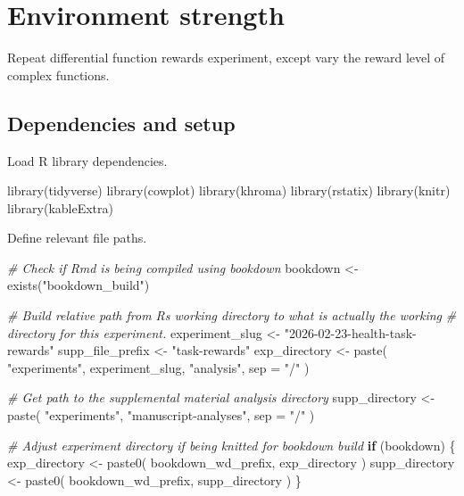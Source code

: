 \documentclass[
]{book}
\newenvironment{Shaded}{\begin{snugshade}}{\end{snugshade}}
\newcommand{\AttributeTok}[1]{\textcolor[rgb]{0.77,0.63,0.00}{#1}}
\newcommand{\CommentTok}[1]{\textcolor[rgb]{0.56,0.35,0.01}{\textit{#1}}}
\newcommand{\ControlFlowTok}[1]{\textcolor[rgb]{0.13,0.29,0.53}{\textbf{#1}}}
\newcommand{\FunctionTok}[1]{\textcolor[rgb]{0.00,0.00,0.00}{#1}}
\newcommand{\NormalTok}[1]{#1}
\newcommand{\OtherTok}[1]{\textcolor[rgb]{0.56,0.35,0.01}{#1}}
\newcommand{\StringTok}[1]{\textcolor[rgb]{0.31,0.60,0.02}{#1}}
\begin{document}
\hypertarget{environment-strength}{%
\chapter{Environment strength}\label{environment-strength}}

Repeat differential function rewards experiment,
except vary the reward level of complex functions.

\hypertarget{dependencies-and-setup-2}{%
\section{Dependencies and setup}\label{dependencies-and-setup-2}}

Load R library dependencies.

\begin{Shaded}
\begin{Highlighting}[]
\FunctionTok{library}\NormalTok{(tidyverse)}
\FunctionTok{library}\NormalTok{(cowplot)}
\FunctionTok{library}\NormalTok{(khroma)}
\FunctionTok{library}\NormalTok{(rstatix)}
\FunctionTok{library}\NormalTok{(knitr)}
\FunctionTok{library}\NormalTok{(kableExtra)}
\end{Highlighting}
\end{Shaded}

Define relevant file paths.

\begin{Shaded}
\begin{Highlighting}[]
\CommentTok{\# Check if Rmd is being compiled using bookdown}
\NormalTok{bookdown }\OtherTok{\textless{}{-}} \FunctionTok{exists}\NormalTok{(}\StringTok{"bookdown\_build"}\NormalTok{)}

\CommentTok{\# Build relative path from R\textquotesingle{}s working directory to what is actually the working}
\CommentTok{\# directory for this experiment.}
\NormalTok{experiment\_slug }\OtherTok{\textless{}{-}} \StringTok{"2026{-}02{-}23{-}health{-}task{-}rewards"}
\NormalTok{supp\_file\_prefix }\OtherTok{\textless{}{-}} \StringTok{"task{-}rewards"}
\NormalTok{exp\_directory }\OtherTok{\textless{}{-}} \FunctionTok{paste}\NormalTok{(}
  \StringTok{"experiments"}\NormalTok{,}
\NormalTok{  experiment\_slug,}
  \StringTok{"analysis"}\NormalTok{,}
  \AttributeTok{sep =} \StringTok{"/"}
\NormalTok{)}

\CommentTok{\# Get path to the supplemental material analysis directory}
\NormalTok{supp\_directory }\OtherTok{\textless{}{-}} \FunctionTok{paste}\NormalTok{(}
  \StringTok{"experiments"}\NormalTok{,}
  \StringTok{"manuscript{-}analyses"}\NormalTok{,}
  \AttributeTok{sep =} \StringTok{"/"}
\NormalTok{)}

\CommentTok{\# Adjust experiment directory if being knitted for bookdown build}
\ControlFlowTok{if}\NormalTok{ (bookdown) \{}
\NormalTok{  exp\_directory }\OtherTok{\textless{}{-}} \FunctionTok{paste0}\NormalTok{(}
\NormalTok{    bookdown\_wd\_prefix,}
\NormalTok{    exp\_directory}
\NormalTok{  )}
\NormalTok{  supp\_directory }\OtherTok{\textless{}{-}} \FunctionTok{paste0}\NormalTok{(}
\NormalTok{    bookdown\_wd\_prefix,}
\NormalTok{    supp\_directory}
\NormalTok{  )}
\NormalTok{\}}
\end{Highlighting}
\end{Shaded}
\end{document}
